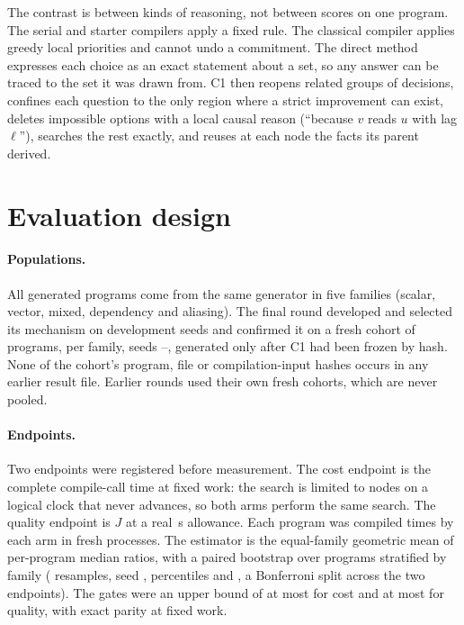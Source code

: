 \documentclass[11pt,a4paper]{article}
\begin{document}
The contrast is between kinds of reasoning, not between scores on one program.
The serial and starter compilers apply a fixed rule. The classical compiler
applies greedy local priorities and cannot undo a commitment. The direct method
expresses each choice as an exact statement about a set, so any answer can be
traced to the set it was drawn from. C1 then reopens related groups of decisions,
confines each question to the only region where a strict improvement can exist,
deletes impossible options with a local causal reason (``because $v$ reads $u$ with
lag $\ell$''), searches the rest exactly, and reuses at each node the facts its
parent derived.

\section{Evaluation design}\label{sec:design}

\paragraph{Populations.} All generated programs come from the same generator in
five families (scalar, vector, mixed, dependency and aliasing). The final round
developed and selected its mechanism on development seeds and confirmed it on a
fresh cohort of  programs,  per family, seeds
--, generated only after C1 had been frozen by hash. None of
the cohort's program, file or compilation-input hashes occurs in any earlier result
file. Earlier rounds used their own fresh cohorts, which are never pooled.

\paragraph{Endpoints.} Two endpoints were registered before measurement. The cost
endpoint is the complete compile-call time at fixed work: the search is limited to
 nodes on a logical clock that never advances, so both arms perform the
same search. The quality endpoint is $J$ at a real \,s allowance. Each program
was compiled  times by each arm in fresh processes. The estimator is the
equal-family geometric mean of per-program median ratios, with a paired bootstrap
over programs stratified by family ( resamples, seed ,
percentiles  and , a Bonferroni split across the two
endpoints). The gates were an upper bound of at most  for cost and at
most  for quality, with exact parity at fixed work.
\end{document}
